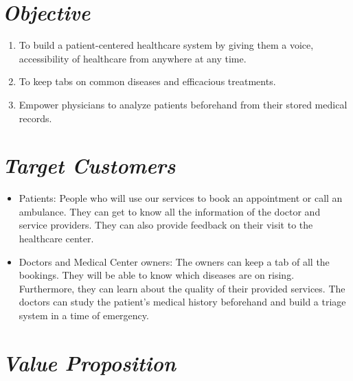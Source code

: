 \documentclass[]{article}
\begin{document}
\section{\texorpdfstring{\textbf{\emph{Objective}}}{Objective}}\label{objective}

\begin{enumerate}
\def\labelenumi{\arabic{enumi}.}
\item
  To build a patient-centered healthcare system by giving them a voice,
  accessibility of healthcare from anywhere at any time.
\item
  To keep tabs on common diseases and efficacious treatments.
\item
  Empower physicians to analyze patients beforehand from their stored
  medical records.
\end{enumerate}

\section{\texorpdfstring{\textbf{\emph{Target
Customers}}}{Target Customers}}\label{target-customers}

\begin{itemize}
\item
  Patients: People who will use our services to book an appointment or
  call an ambulance. They can get to know all the information of the
  doctor and service providers. They can also provide feedback on their
  visit to the healthcare center.
\item
  Doctors and Medical Center owners: The owners can keep a tab of all
  the bookings. They will be able to know which diseases are on rising.
  Furthermore, they can learn about the quality of their provided
  services. The doctors can study the patient's medical history
  beforehand and build a triage system in a time of emergency.
\end{itemize}

\section{\texorpdfstring{\textbf{\emph{Value
Proposition}}}{Value Proposition}}\label{value-proposition}
\end{document}
